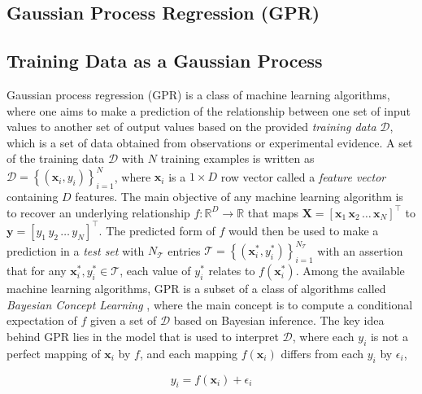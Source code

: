 \begin{spacing}{2.0}
    \section{Gaussian Process Regression (GPR)}

    \subsection{Training Data as a Gaussian Process}

    Gaussian process regression (GPR) is a class of machine learning algorithms, where one aims to make a prediction of the relationship between 
    one set of input values to another set of output values based on the provided \textsl{training data} $\mathcal{D}$, which is a set of data 
    obtained from observations or experimental evidence. A set of the training data $\mathcal{D}$ with $N$ training examples is written as
    $\mathcal{D} = \left\{(\mathbf{x}_i,y_i)\right\}_{i=1}^N$, where $\mathbf{x}_i$ is a $1 \times D$ row vector called a \textsl{feature vector}
    containing $D$ features. The main objective of any machine learning algorithm is to recover an underlying relationship $f:\mathbb{R}^D\to\mathbb{R}$
    that maps $\mathbf{X} = \left[\mathbf{x}_1\,\mathbf{x}_2\,\ldots\,\mathbf{x}_N\right]^{\top}$ to $\mathbf{y} = \left[y_1\,y_2\,\ldots\,y_N\right]^{\top}$.
    The predicted form of $f$ would then be used to make a prediction in a \textsl{test set} with $N_{\mathcal{T}}$ entries
    $\mathcal{T} = \left\{(\mathbf{x}_i^*,y_i^*)\right\}_{i=1}^{N_{\mathcal{T}}}$ with an assertion that for any $\mathbf{x}_i^*,y_i^*\in\mathcal{T}$,
    each value of $y_i^*$ relates to $f(\mathbf{x}_i^*)$. Among the available machine learning algorithms, GPR is a subset of a class of algorithms
    called \textsl{Bayesian Concept Learning} \cite{B-MachineLearning-Murphy}, where the main concept is to compute a conditional expectation of $f$
    given a set of $\mathcal{D}$ based on Bayesian inference. The key idea behind GPR lies in the model that is used to interpret $\mathcal{D}$, 
    where each $y_i$ is not a perfect mapping of $\mathbf{x}_i$ by $f$, and each mapping $f(\mathbf{x}_i)$ differs from each $y_i$ by $\epsilon_i$,

    \begin{equation}
        y_i = f(\mathbf{x}_i) + \epsilon_i
        \label{eq:gpr-training-data-model}
    \end{equation}


\end{spacing}
